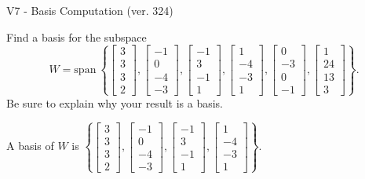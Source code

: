 \begin{exercise}
  \begin{exerciseTitle}V7 - Basis Computation (ver. 324)\end{exerciseTitle}
  \begin{exerciseStatement}
    Find a basis for the subspace 
\[W=\mathrm{span}\ \left\{\left[\begin{array}{r}
3 \\
3 \\
3 \\
2
\end{array}\right] , \left[\begin{array}{r}
-1 \\
0 \\
-4 \\
-3
\end{array}\right] , \left[\begin{array}{r}
-1 \\
3 \\
-1 \\
1
\end{array}\right] , \left[\begin{array}{r}
1 \\
-4 \\
-3 \\
1
\end{array}\right] , \left[\begin{array}{r}
0 \\
-3 \\
0 \\
-1
\end{array}\right] , \left[\begin{array}{r}
1 \\
24 \\
13 \\
3
\end{array}\right]\right\}.\]
 Be sure to explain why your result is a basis.


  \end{exerciseStatement}
  \begin{exerciseAnswer}
   A basis of \(W\) is  \(\left\{\left[\begin{array}{r}
3 \\
3 \\
3 \\
2
\end{array}\right] , \left[\begin{array}{r}
-1 \\
0 \\
-4 \\
-3
\end{array}\right] , \left[\begin{array}{r}
-1 \\
3 \\
-1 \\
1
\end{array}\right] , \left[\begin{array}{r}
1 \\
-4 \\
-3 \\
1
\end{array}\right]\right\}\).
  


  \end{exerciseAnswer}
\end{exercise}